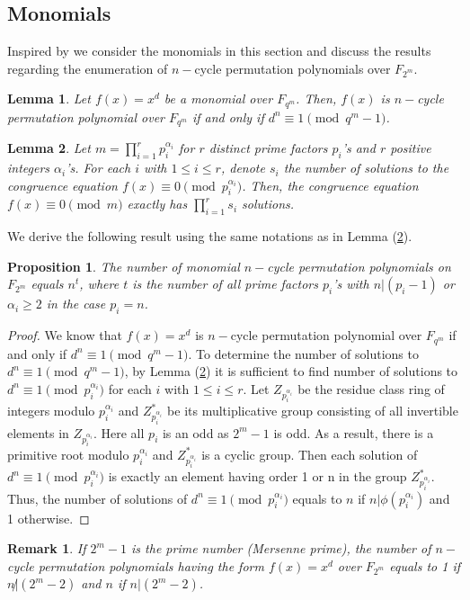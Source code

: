 \documentclass[12pt,a4paper]{article}
\newtheorem{proposition}{Proposition}[section]
\newtheorem{remark}{Remark}[section]
\newtheorem{lemma}{Lemma}[section]
\begin{document}
\subsection{Monomials}
Inspired by \cite{niu2023more,cohn2012advanced} we consider the monomials in this section and discuss the results regarding the enumeration of $ n-$cycle permutation polynomials over $ F_{2^{m}} $.
\begin{lemma}\cite{niu2023more}\label{l1}
	Let $ f(x)=x^{d} $ be a monomial over $ F_{q^{m}} $. Then, $ f(x) $ is $ n-$cycle permutation polynomial over $ F_{q^{m}} $ if and only if $d^n \equiv 1 \pmod{q^m-1}$.
\end{lemma}
\begin{lemma}\cite{cohn2012advanced}\label{l4}
	Let $ m=\prod_{i=1}^{r}p_{i}^{\alpha_{i}} $ for $ r $ distinct prime factors $ p_{i} $'s	and $ r $ positive integers $ \alpha_{i} $'s. For each $ i $ with $1\leq i\leq r$, denote $ s_{i} $ the number of solutions to the congruence equation $ f(x)\equiv0\pmod {p_{i}^{\alpha_{i}}} $. Then, the congruence equation $ f(x)\equiv0\pmod m $ exactly has $ \prod_{i=1}^{r}s_{i} $ solutions.
\end{lemma}
We derive the following result using the same notations as in Lemma  (\ref{l4}).
\begin{proposition}
	The number of monomial $ n-$cycle permutation polynomials on $ F_{2^{m}} $ equals $ n^{t} $, where $ t $ is the number of all prime factors $ p_{i} $'s with $ n|(p_{i}-1) $ or $ \alpha_{i}\geq2  $ in the case $ p_{i}=n $.	
\end{proposition}
\begin{proof}
	We know that $ f(x)=x^{d} $ is $ n-$cycle permutation polynomial over $ F_{q^{m}} $ if and only if $ d^{n}\equiv1\pmod{ q^{m}-1} $. To determine the number of solutions to $ d^{n}\equiv1\pmod{ q^{m}-1} $, by Lemma (\ref{l4}) it is sufficient to find number of solutions to $ d^{n}\equiv1\pmod {p_{i}^{\alpha_{i}}} $ for each $ i $ with $1\leq i\leq r$. Let $ Z_{p_{i}^{\alpha_{i}}} $	be the residue class ring of integers modulo $p_{i}^{\alpha_{i}}$ and $ Z_{p_{i}^{\alpha_{i}}}^{*} $ be its multiplicative group consisting of all invertible elements in $ Z_{p_{i}^{\alpha_{i}}} $. Here all $ p_{i} $ is an odd as $ 2^{m}-1 $ is odd. As a result, there is a primitive root modulo $ p_{i}^{\alpha_{i}} $ and $ Z_{p_{i}^{\alpha_{i}}}^{*} $ is a cyclic group. Then each solution of  $ d^{n}\equiv1\pmod {p_{i}^{\alpha_{i}}} $ is exactly an element having order 1 or n in the group $ Z_{p_{i}^{\alpha_{i}}}^{*} $. Thus, the number of solutions of $ d^{n}\equiv1\pmod {p_{i}^{\alpha_{i}}} $  equals to $ n $ if $ n|\phi(p_{i}^{\alpha_{i}}) $ and 1 otherwise. 
\end{proof}
\begin{remark}
	If $ 2^{m}-1 $ is the prime number (Mersenne prime), the number of $ n-$cycle permutation polynomials having the form $ f(x)=x^{d} $ over $ F_{2^{m}} $ equals to 1 if $ n\not|(2^{m}-2) $ and $ n $ if $ n|(2^{m}-2) $.	
\end{remark}
\end{document}
